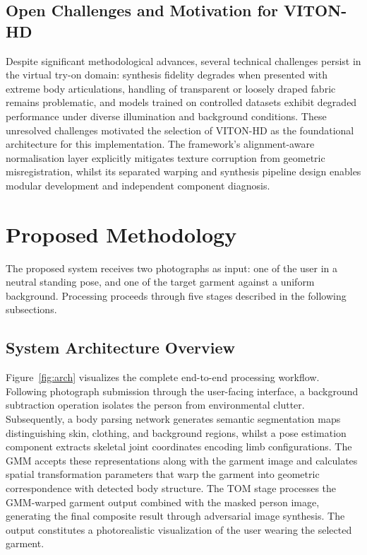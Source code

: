 \documentclass[conference]{IEEEtran}
\begin{document}
\subsection{Open Challenges and Motivation for VITON-HD}

Despite significant methodological advances, several technical challenges persist in the virtual try-on domain: synthesis fidelity degrades when presented with extreme body articulations, handling of transparent or loosely draped fabric remains problematic, and models trained on controlled datasets exhibit degraded performance under diverse illumination and background conditions. These unresolved challenges motivated the selection of VITON-HD as the foundational architecture for this implementation. The framework's alignment-aware normalisation layer explicitly mitigates texture corruption from geometric misregistration, whilst its separated warping and synthesis pipeline design enables modular development and independent component diagnosis.

\section{Proposed Methodology}

The proposed system receives two photographs as input: one of the user in a neutral standing pose, and one of the target garment against a uniform background. Processing proceeds through five stages described in the following subsections.

\subsection{System Architecture Overview}

Figure~\ref{fig:arch} visualizes the complete end-to-end processing workflow. Following photograph submission through the user-facing interface, a background subtraction operation isolates the person from environmental clutter. Subsequently, a body parsing network generates semantic segmentation maps distinguishing skin, clothing, and background regions, whilst a pose estimation component extracts skeletal joint coordinates encoding limb configurations. The GMM accepts these representations along with the garment image and calculates spatial transformation parameters that warp the garment into geometric correspondence with detected body structure. The TOM stage processes the GMM-warped garment output combined with the masked person image, generating the final composite result through adversarial image synthesis. The output constitutes a photorealistic visualization of the user wearing the selected garment.
\end{document}
